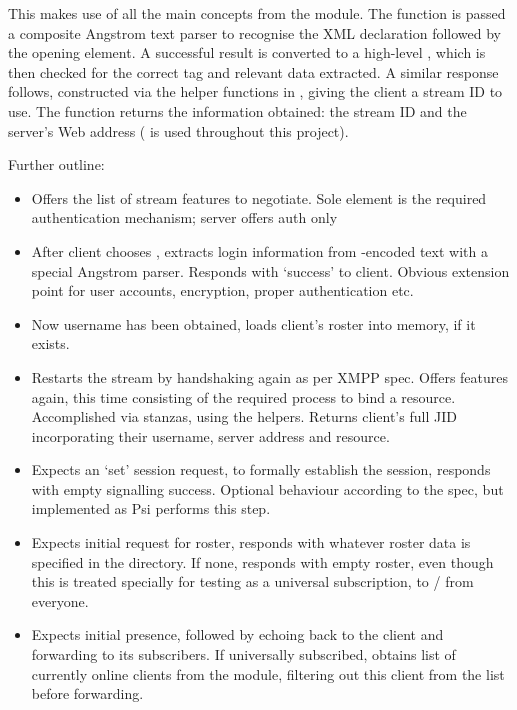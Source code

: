 \documentclass[12pt,a4paper,twoside,openright]{report}
\begin{document}
{This makes use of all the main concepts from the  module. The  function is passed a composite Angstrom text parser to recognise the XML declaration followed by the opening  element. A successful result is converted to a high-level , which is then checked for the correct tag and relevant data extracted. A similar response follows, constructed via the helper functions in , giving the client a stream ID to use. The function returns the information obtained: the stream ID and the server's Web address ( is used throughout this project).

Further outline:

\begin{itemize}
  \item Offers the list of stream features to negotiate. Sole element is the required authentication mechanism; server offers  auth only

  \item After client chooses , extracts login information from -encoded text with a special Angstrom parser. Responds with `success' to client. Obvious extension point for user accounts, encryption, proper authentication etc.

  \item Now username has been obtained, loads client's roster into memory, if it exists.

  \item Restarts the stream by handshaking again as per XMPP spec. Offers features again, this time consisting of the required process to bind a resource. Accomplished via  stanzas, using the  helpers. Returns client's full JID incorporating their username, server address and resource.

  \item Expects an  `set' session request, to formally establish the session, responds with empty  signalling success. Optional behaviour according to the spec, but implemented as Psi performs this step.

  \item Expects initial request for roster, responds with whatever roster data is specified in the  directory. If none, responds with empty roster, even though this is treated specially for testing as a universal subscription, to / from everyone.

  \item Expects initial presence, followed by echoing back to the client and forwarding to its subscribers. If universally subscribed, obtains list of currently online clients from the  module, filtering out this client from the list before forwarding.


\end{itemize}}
\end{document}
